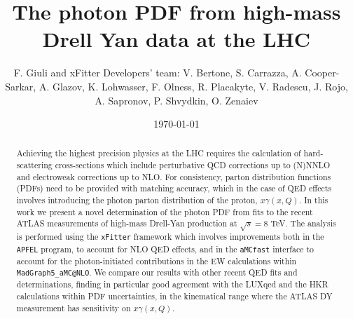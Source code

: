 \documentclass[english,aps]{revtex4-1}
\begin{document}
\linenumbers

\title{The photon PDF from high-mass Drell Yan data at the LHC}

\author{F. Giuli and xFitter Developers' team: V. Bertone, S. Carrazza, A. Cooper-Sarkar, A. Glazov, K. Lohwasser, F. Olness,
 R. Placakyte, V. Radescu,  J. Rojo, A. Sapronov, P. Shvydkin,  O. Zenaiev }

\date{\today}
\begin{abstract}
  Achieving the highest precision physics at the LHC requires the 
  calculation of hard-scattering cross-sections which include
  perturbative QCD corrections up to (N)NNLO and electroweak
  corrections up to NLO.
  For consistency, parton distribution functions (PDFs) need to be
  provided with matching accuracy, which in the case of QED effects
  involves introducing the photon parton distribution of the proton,
  $x\gamma(x,Q)$.
  In this work we present a novel determination of the photon PDF from
  fits to the recent ATLAS measurements of high-mass Drell-Yan
  production at $\sqrt{s}=8$ TeV.
  The analysis is performed using the {\tt xFitter} framework which
  involves improvements both in the {\tt APFEL} program, to account
  for NLO QED effects, and in the {\tt aMCfast} interface to account
  for the photon-initiated contributions in the EW calculations within
  {\tt MadGraph5\_aMC@NLO}.
  We compare our results with other recent QED fits and
  determinations, finding in particular good agreement with the LUXqed
  and the HKR calculations within PDF uncertainties, in the
  kinematical range where the ATLAS DY measurement has sensitivity on
  $x\gamma(x,Q)$.
\end{abstract}
\maketitle

\tableofcontents{}












\end{document}
